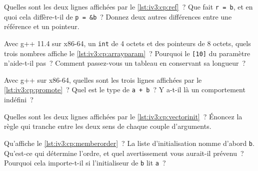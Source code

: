 \begin{question}\label{iq:iv3:cpp:4}
Quelles sont les deux lignes affichées par le \cref{lst:iv3:cp:ref}~? Que fait \texttt{r = b}, et en quoi cela diffère-t-il de \texttt{p = \&b}~? Donnez deux autres différences entre une référence et un pointeur.
\label{lst:iv3:cp:ref}
\end{question}

\begin{question}\label{iq:iv3:cpp:5}
Avec g++ 11.4 sur x86-64, un \texttt{int} de 4 octets et des pointeurs de 8 octets, quels trois nombres affiche le \cref{lst:iv3:cp:arrayparam}~? Pourquoi le \texttt{[10]} du paramètre n'aide-t-il pas~? Comment passez-vous un tableau en conservant sa longueur~?
\label{lst:iv3:cp:arrayparam}
\end{question}

\begin{question}\label{iq:iv3:cpp:6}
Avec g++ sur x86-64, quelles sont les trois lignes affichées par le \cref{lst:iv3:cp:promote}~? Quel est le type de \texttt{a + b}~? Y a-t-il là un comportement indéfini~?
\label{lst:iv3:cp:promote}
\end{question}

\begin{question}\label{iq:iv3:cpp:7}
Quelles sont les deux lignes affichées par le \cref{lst:iv3:cp:vectorinit}~? Énoncez la règle qui tranche entre les deux sens de chaque couple d'arguments.
\label{lst:iv3:cp:vectorinit}
\end{question}

\begin{question}\label{iq:iv3:cpp:8}
Qu'affiche le \cref{lst:iv3:cp:memberorder}~? La liste d'initialisation nomme d'abord \texttt{b}. Qu'est-ce qui détermine l'ordre, et quel avertissement vous aurait-il prévenu~? Pourquoi cela importe-t-il si l'initialiseur de \texttt{b} lit \texttt{a}~?
\label{lst:iv3:cp:memberorder}
\end{question}

